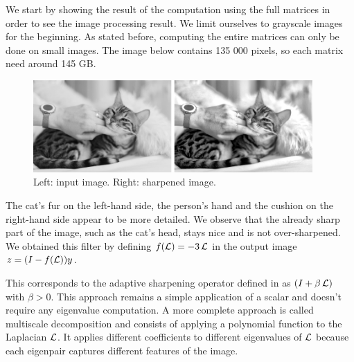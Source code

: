 We start by showing the result of the computation using the full matrices in order to see the image processing result.
We limit ourselves to grayscale images for the beginning.
As stated before, computing the entire matrices can only be done on small images.
The image below contains 135 000 pixels, so each matrix need around 145 GB.

\begin{figure}[H]
  \centering
  \includegraphics[width=0.95\textwidth]{img/cat.png}
  \caption{Left: input image. Right: sharpened image.}
\end{figure}

The cat's fur on the left-hand side, the person's hand and the cushion on the right-hand side appear to be more detailed.
We observe that the already sharp part of the image, such as the cat's head, stays nice and is not over-sharpened.
We obtained this filter by defining \(f(\operatorname{\mathcal{L}}) = -3\operatorname{\mathcal{L}}\) in the output image \(z = (I - f(\operatorname{\mathcal{L}}))y\).

This corresponds to the adaptive sharpening operator defined in \cite{siam_slides_2016} as \((I + \beta \operatorname{\mathcal{L}})\) with \(\beta > 0\).
This approach remains a simple application of a scalar and doesn't require any eigenvalue computation.
A more complete approach is called multiscale decomposition \cite{talebi_nonlocal_2014} and consists of applying a polynomial function to the Laplacian \(\operatorname{\mathcal{L}}\).
It applies different coefficients to different eigenvalues of \(\operatorname{\mathcal{L}}\) because each eigenpair captures different features of the image.
